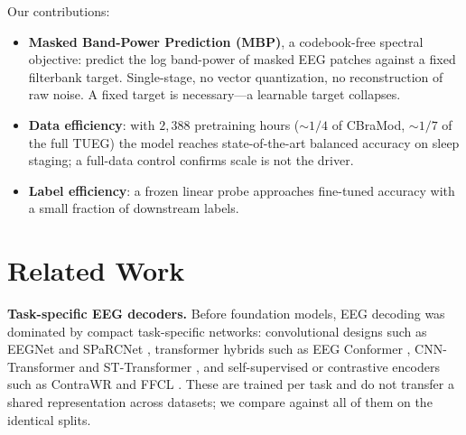 \documentclass[letterpaper]{article} %
\begin{document}
\noindent Our contributions:
\begin{itemize}
\item \textbf{Masked Band-Power Prediction (MBP)}, a codebook-free spectral
objective: predict the log band-power of masked EEG patches against a fixed
filterbank target. Single-stage, no vector quantization, no reconstruction of raw
noise. A fixed target is necessary---a learnable target collapses.
\item \textbf{Data efficiency}: with $2{,}388$ pretraining hours (${\sim}1/4$
of CBraMod, ${\sim}1/7$ of the full TUEG) the model reaches state-of-the-art
balanced accuracy on sleep staging; a full-data control confirms
scale is not the driver.
\item \textbf{Label efficiency}: a frozen linear probe approaches fine-tuned
accuracy with a small fraction of downstream labels.
\end{itemize}

\section{Related Work}
\noindent\textbf{Task-specific EEG decoders.} Before foundation models, EEG
decoding was dominated by compact task-specific networks: convolutional designs
such as EEGNet \cite{lawhern2018eegnet} and SPaRCNet \cite{jing2023sparcnet},
transformer hybrids such as EEG Conformer \cite{song2023conformer},
CNN-Transformer \cite{peh2022cnntransformer} and ST-Transformer
\cite{song2021sttransformer}, and self-supervised or contrastive encoders such as
ContraWR \cite{yang2023contrawr} and FFCL \cite{li2022ffcl}. These are trained per
task and do not transfer a shared representation across datasets; we compare
against all of them on the identical splits.
\end{document}
